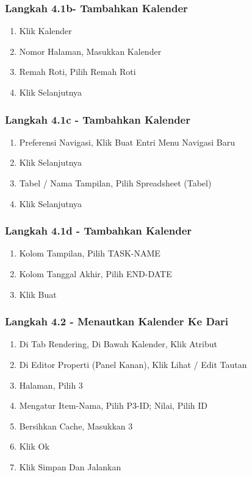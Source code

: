 \documentclass{article}
\begin{document}
\subsubsection{Langkah 4.1b- Tambahkan Kalender}
\begin{enumerate}
    \item Klik Kalender
    \item Nomor Halaman, Masukkan Kalender
    \item Remah Roti, Pilih Remah Roti
    \item Klik Selanjutnya
    \end{enumerate}
\subsubsection{Langkah 4.1c - Tambahkan Kalender}
\begin{enumerate}
    \item Preferensi Navigasi, Klik Buat Entri Menu Navigasi Baru
    \item Klik Selanjutnya
    \item Tabel / Nama Tampilan, Pilih Spreadsheet (Tabel)
    \item Klik Selanjutnya
    \end{enumerate}
\subsubsection{Langkah 4.1d - Tambahkan Kalender}
\begin{enumerate}
    \item Kolom Tampilan, Pilih TASK-NAME
    \item Kolom Tanggal Akhir, Pilih END-DATE
    \item Klik Buat
    \end{enumerate}
\subsubsection{Langkah 4.2 - Menautkan Kalender Ke Dari}
\begin{enumerate}
    \item Di Tab Rendering, Di Bawah Kalender, Klik Atribut
    \item Di Editor Properti (Panel Kanan), Klik Lihat / Edit Tautan
    \item Halaman, Pilih 3
    \item Mengatur Item-Nama, Pilih P3-ID; Nilai, Pilih ID
    \item Bersihkan Cache, Masukkan 3
    \item Klik Ok
    \item Klik Simpan Dan Jalankan
    \end{enumerate}
\end{document}

